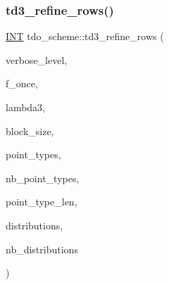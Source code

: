 \subsubsection{\texorpdfstring{td3\+\_\+refine\+\_\+rows()}{td3\_refine\_rows()}}
{\footnotesize\ttfamily \mbox{\hyperlink{galois_8h_a09fddde158a3a20bd2dcadb609de11dc}{I\+NT}} tdo\+\_\+scheme\+::td3\+\_\+refine\+\_\+rows (\begin{DoxyParamCaption}\item[{\mbox{\hyperlink{galois_8h_a09fddde158a3a20bd2dcadb609de11dc}{I\+NT}}}]{verbose\+\_\+level,  }\item[{\mbox{\hyperlink{galois_8h_a09fddde158a3a20bd2dcadb609de11dc}{I\+NT}}}]{f\+\_\+once,  }\item[{\mbox{\hyperlink{galois_8h_a09fddde158a3a20bd2dcadb609de11dc}{I\+NT}}}]{lambda3,  }\item[{\mbox{\hyperlink{galois_8h_a09fddde158a3a20bd2dcadb609de11dc}{I\+NT}}}]{block\+\_\+size,  }\item[{\mbox{\hyperlink{galois_8h_a09fddde158a3a20bd2dcadb609de11dc}{I\+NT}} $\ast$\&}]{point\+\_\+types,  }\item[{\mbox{\hyperlink{galois_8h_a09fddde158a3a20bd2dcadb609de11dc}{I\+NT}} \&}]{nb\+\_\+point\+\_\+types,  }\item[{\mbox{\hyperlink{galois_8h_a09fddde158a3a20bd2dcadb609de11dc}{I\+NT}} \&}]{point\+\_\+type\+\_\+len,  }\item[{\mbox{\hyperlink{galois_8h_a09fddde158a3a20bd2dcadb609de11dc}{I\+NT}} $\ast$\&}]{distributions,  }\item[{\mbox{\hyperlink{galois_8h_a09fddde158a3a20bd2dcadb609de11dc}{I\+NT}} \&}]{nb\+\_\+distributions }\end{DoxyParamCaption})}

\mbox{\label{classtdo__scheme_ab95849a5724427be94e1d7d418ce67dc}} 
